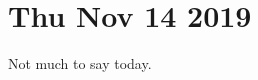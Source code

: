 \documentclass[main.tex]{subfiles}
\begin{document}
\section*{Thu Nov 14 2019}

Not much to say today.
\end{document}
